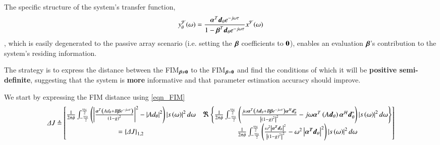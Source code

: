 The specific structure of the system's transfer function,
$$ 
y_{\theta}^{\mathcal{F}}(\omega) 
=
\frac
{
\boldsymbol{\alpha}^{T}
\boldsymbol{d}_{\theta}
e^{-j\omega\tau}
}
{
1
-
\boldsymbol{\beta}^{T}\boldsymbol{d}_{\theta}
e^{-j\omega\tau}
}
x^{\mathcal{F}}(\omega)
$$
, which is easily degenerated to the passive array scenario (i.e. setting the $ \boldsymbol{\beta} $ coefficients to $ \boldsymbol{0} $), enables an evaluation $ \boldsymbol{\beta} $'s contribution to the system's residing information.
\par The strategy is to express the distance between the FIM$_{\boldsymbol{\beta}\neq\boldsymbol{0}}$ to the FIM$_{\boldsymbol{\beta}=\boldsymbol{0}}$ and find the conditions of which it will be \textbf{positive semi-definite}, suggesting that the system is \textbf{more} informative and that parameter estimation accuracy should improve.
\par We start by expressing the FIM distance using \ref{eqn_FIM}\\
\resizebox{1.1 \textwidth}{!} 
{
\begin{equation*}
    \Delta{J} \triangleq 
    \begin{bmatrix}
        \frac{1}{2\pi\phi}
        \int_{-\frac{\omega_{s}}{2}}^{\frac{\omega_{s}}{2}}
        \left(\left|
        \frac
        {
        \boldsymbol{\alpha}^{T}
        \left(
        Ad_{\theta} + B\boldsymbol{\beta}e^{-j\omega\tau}
        \right)
        }
        {\left(1-g\right)^{2}}
        \right|^{2}
        -
        \left|Ad_{\theta}\right|^{2}
        \right)
        \left|
        s\left(\omega\right)
        \right|^{2}
        d\omega
        &
        \Re
        \left\{
        \frac{1}{2\pi\phi}
        \int_{-\frac{\omega_{s}}{2}}^{\frac{\omega_{s}}{2}}
        \left(\frac
        {
        j\omega\boldsymbol{\alpha}^{T}
        \left(
        A\boldsymbol{d}_{\theta}+B\boldsymbol{\beta}e^{-j\omega\tau}
        \right)
        \boldsymbol{\alpha}^{H}\boldsymbol{d}^{*}_{\theta}
        }
        {\left|\left(1-g\right)^{2}\right|^{2}}
        -
        j\omega\boldsymbol{\alpha}^{T}
        \left(
        A\boldsymbol{d}_{\theta}
        \right)
        \boldsymbol{\alpha}^{H}\boldsymbol{d}^{*}_{\theta}
        \right)
        \left|
        s\left(\omega\right)
        \right|^{2}
        d\omega
        \right\}
        \\
        =\left\{\Delta{J}\right\}_{1,2}
        & 
        \frac{1}{2\pi\phi}
        \int_{-\frac{\omega_{s}}{2}}^{\frac{\omega_{s}}{2}}
        \left(
        \frac{
        \omega^{2}
        \left|
        \boldsymbol{\alpha^{T}}\boldsymbol{d}_{\theta}
        \right|^{2}
        }
        {\left|\left(1-g\right)^{2}\right|^{2}}
        -
        \omega^{2}
        \left|
        \boldsymbol{\alpha^{T}}\boldsymbol{d}_{\theta}
        \right|^{2}
        \right)
        \left|
        s\left(\omega\right)
        \right|^{2}
        d\omega
        \\
    \end{bmatrix}
\end{equation*}
}
